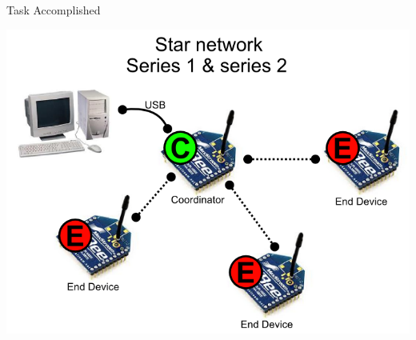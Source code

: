\documentclass[11pt, a4paper]{beamer}
\begin{document}
\begin{frame}{Task Accomplished}
\begin{itemize}
\begin{center}
			\includegraphics[scale =.12]{images/star.png}
			\end{center}
\end{itemize}
\end{frame}
\end{document}
